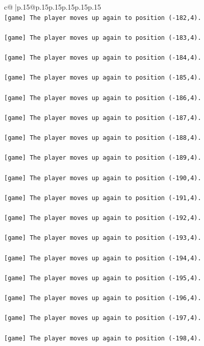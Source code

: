 \documentclass{article}
\begin{document}
{\begin{supertabular}{c@{$\;$}|p{.15\linewidth}@{}p{.15\linewidth}p{.15\linewidth}p{.15\linewidth}p{.15\linewidth}p{.15\linewidth}}
{{{\\ 
\texttt{{[}game{]} The player moves up again to position ({-}182,4).} \\
\\ 
\texttt{{[}game{]} The player moves up again to position ({-}183,4).} \\
\\ 
\texttt{{[}game{]} The player moves up again to position ({-}184,4).} \\
\\ 
\texttt{{[}game{]} The player moves up again to position ({-}185,4).} \\
\\ 
\texttt{{[}game{]} The player moves up again to position ({-}186,4).} \\
\\ 
\texttt{{[}game{]} The player moves up again to position ({-}187,4).} \\
\\ 
\texttt{{[}game{]} The player moves up again to position ({-}188,4).} \\
\\ 
\texttt{{[}game{]} The player moves up again to position ({-}189,4).} \\
\\ 
\texttt{{[}game{]} The player moves up again to position ({-}190,4).} \\
\\ 
\texttt{{[}game{]} The player moves up again to position ({-}191,4).} \\
\\ 
\texttt{{[}game{]} The player moves up again to position ({-}192,4).} \\
\\ 
\texttt{{[}game{]} The player moves up again to position ({-}193,4).} \\
\\ 
\texttt{{[}game{]} The player moves up again to position ({-}194,4).} \\
\\ 
\texttt{{[}game{]} The player moves up again to position ({-}195,4).} \\
\\ 
\texttt{{[}game{]} The player moves up again to position ({-}196,4).} \\
\\ 
\texttt{{[}game{]} The player moves up again to position ({-}197,4).} \\
\\ 
\texttt{{[}game{]} The player moves up again to position ({-}198,4).} \\
}}}
\end{supertabular}}
\end{document}
